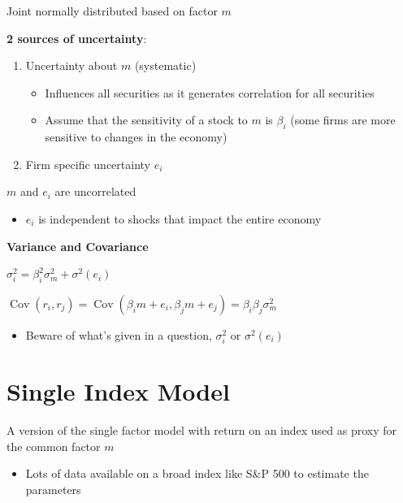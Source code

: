 \documentclass[]{book}
\providecommand{\tightlist}{%
  \setlength{\itemsep}{0pt}\setlength{\parskip}{0pt}}
\theoremstyle{definition}
\theoremstyle{definition}
\theoremstyle{remark}
\begin{document}
Joint normally distributed based on factor \(m\)

\textbf{2 sources of uncertainty}:

\begin{enumerate}
\def\labelenumi{\arabic{enumi})}
\item
  Uncertainty about \(m\) (systematic)

  \begin{itemize}
  \item
    Influences all securities as it generates correlation for all
    securities
  \item
    Assume that the sensitivity of a stock to \(m\) is \(\beta_i\) (some
    firms are more sensitive to changes in the economy)
  \end{itemize}
\item
  Firm specific uncertainty \(e_i\)
\end{enumerate}

\(m\) and \(e_i\) are uncorrelated

\begin{itemize}
\tightlist
\item
  \(e_i\) is independent to shocks that impact the entire economy
\end{itemize}

\textbf{Variance and Covariance}

\(\sigma^2_i = \beta^2_i \sigma^2_m + \sigma^2(e_i)\)

\(\operatorname{Cov}(r_i, r_j) = \operatorname{Cov}(\beta_i m + e_i, \beta_j m + e_j) = \beta_i \beta_j \sigma^2_m\)

\begin{itemize}
\tightlist
\item
  Beware of what's given in a question, \(\sigma^2_i\) or
  \(\sigma^2(e_i)\)
\end{itemize}

\section{Single Index Model}\label{single-index-model}

A version of the single factor model with return on an index used as
proxy for the common factor \(m\)

\begin{itemize}
\tightlist
\item
  Lots of data available on a broad index like S\&P 500 to estimate the
  parameters
\end{itemize}
\end{document}
